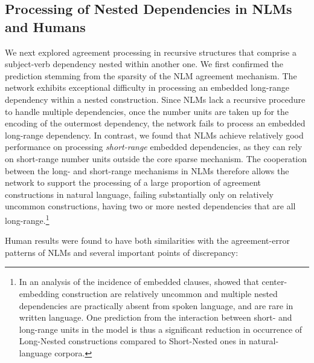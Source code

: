 \subsection{Processing of Nested Dependencies in NLMs and Humans}
We next explored agreement processing in recursive structures that comprise a subject-verb dependency nested within another one. We first confirmed the prediction stemming from the sparsity of the NLM agreement mechanism. The network exhibits exceptional difficulty in processing an embedded long-range dependency within a nested construction. Since NLMs lack a recursive procedure to handle multiple dependencies, once the number units are taken up for the encoding of the outermost dependency, the network fails to process an embedded long-range dependency. In contrast, we found that NLMs achieve relatively good performance on processing \textit{short-range} embedded dependencies, as they can rely on short-range number units outside the core sparse mechanism. The cooperation between the long- and short-range mechanisms in NLMs therefore allows the network to support the processing of a large proportion of agreement constructions in natural language, failing substantially only on relatively uncommon constructions, having two or more nested dependencies that are all long-range.\footnote{In an analysis of the incidence of embedded clauses, \citet{karlsson2007constraints} showed that center-embedding construction are relatively uncommon and multiple nested dependencies are practically absent from spoken language, and are rare in written language. One prediction from the interaction between short- and long-range units in the model is thus a significant reduction in occurrence of Long-Nested constructions compared to Short-Nested ones in natural-language corpora.}

Human results were found to have both similarities with the agreement-error patterns of NLMs and several important points of discrepancy:

